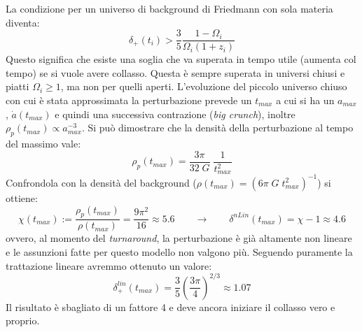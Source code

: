 La condizione per un universo di background di Friedmann con sola materia diventa:
$$
\delta_+ (t_i) > \frac{3}{5}\frac{1-\Omega_i}{\Omega_i (1+z_i)}
$$
Questo significa che esiste una soglia che va superata in tempo utile (aumenta col tempo) se si vuole avere collasso. Questa è sempre superata in universi chiusi e piatti $\Omega_i \geq 1$, ma non per quelli aperti. L'evoluzione del piccolo universo chiuso con cui è stata approssimata la perturbazione prevede un $t_{max}$ a cui si ha un $a_{max}$, $\dot{a}(t_{max})$ e quindi una successiva contrazione (\textit{big crunch}), inoltre $\rho_p (t_{max})\propto a_{max}^{-3}$. Si può dimostrare che la densità della perturbazione al tempo del massimo vale:
\begin{equation}
    \rho_p (t_{max})=\frac{3\pi }{32\; G} \; \frac{1}{t_{max}^2}
\end{equation}
Confrondola con la densità del background ($\rho(t_{max})=(6\pi \; G \; t_{max}^2)^{-1}$) si ottiene:
$$
\chi (t_{max}):= \frac{\rho_p(t_{max})}{\rho (t_{max})}= \frac{9\pi^2}{16}\approx 5.6 \qquad \rightarrow\qquad \delta^{nLin} (t_{max})= \chi -1 \approx 4.6
$$
ovvero, al momento del \textit{turnaround}, la perturbazione è già altamente non lineare e le assunzioni fatte per questo modello non valgono più. Seguendo puramente la trattazione lineare avremmo ottenuto un valore:
$$
\delta_+^{lin}(t_{max})=\frac{3}{5} \left(\frac{3\pi}{4}\right)^{2/3}\approx 1.07
$$
Il risultato è sbagliato di un fattore 4 e deve ancora iniziare il collasso vero e proprio.



